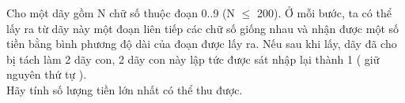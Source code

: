 Cho một dãy gồm N chữ số thuộc đoạn 0..9 (N $\le$ 200). Ở mỗi bước, ta có thể lấy ra từ dãy này một đoạn liên tiếp các chữ số giống nhau và nhận được một số tiền bằng bình phương độ dài của đoạn được lấy ra. Nếu sau khi lấy, dãy đã cho bị tách làm 2 dãy con, 2 dãy con này lập tức được sát nhập lại thành 1 ( giữ nguyên thứ tự ).   
\\   Hãy tính số lượng tiền lớn nhất có thể thu được.  

\
